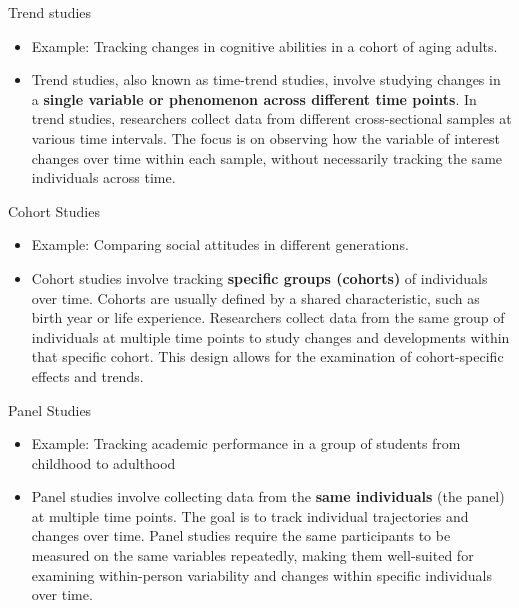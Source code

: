 \documentclass[
  ignorenonframetext,
  aspectratio=169,
]{beamer}
\providecommand{\tightlist}{%
  \setlength{\itemsep}{0pt}\setlength{\parskip}{0pt}}\usepackage{longtable,booktabs,array}
\begin{document}
\begin{frame}{Trend studies}
\label{trend-studies}
\begin{itemize}[<+->]
\tightlist
\item
  Example: Tracking changes in cognitive abilities in a cohort of aging
  adults.
\item
  Trend studies, also known as time-trend studies, involve studying
  changes in a \textbf{single variable or phenomenon across different
  time points}. In trend studies, researchers collect data from
  different cross-sectional samples at various time intervals. The focus
  is on observing how the variable of interest changes over time within
  each sample, without necessarily tracking the same individuals across
  time.
\end{itemize}
\end{frame}

\begin{frame}{Cohort Studies}
\label{cohort-studies}
\begin{itemize}[<+->]
\tightlist
\item
  Example: Comparing social attitudes in different generations.
\item
  Cohort studies involve tracking \textbf{specific groups (cohorts)} of
  individuals over time. Cohorts are usually defined by a shared
  characteristic, such as birth year or life experience. Researchers
  collect data from the same group of individuals at multiple time
  points to study changes and developments within that specific cohort.
  This design allows for the examination of cohort-specific effects and
  trends.
\end{itemize}
\end{frame}

\begin{frame}{Panel Studies}
\label{panel-studies}
\begin{itemize}[<+->]
\tightlist
\item
  Example: Tracking academic performance in a group of students from
  childhood to adulthood
\item
  Panel studies involve collecting data from the \textbf{same
  individuals} (the panel) at multiple time points. The goal is to track
  individual trajectories and changes over time. Panel studies require
  the same participants to be measured on the same variables repeatedly,
  making them well-suited for examining within-person variability and
  changes within specific individuals over time.
\end{itemize}
\end{frame}
\end{document}
